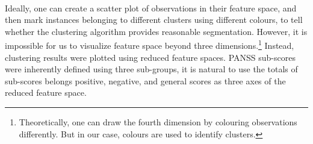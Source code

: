 \documentclass[11pt]{article}
\begin{document}
	\paragraph{} Ideally, one can create a scatter plot of observations in their feature space, and then mark instances belonging to different clusters using different colours, to tell whether the clustering algorithm provides reasonable segmentation. However, it is impossible for us to visualize feature space beyond three dimensions.\footnote{Theoretically, one can draw the fourth dimension by colouring observations differently. But in our case, colours are used to identify clusters.} Instead, clustering results were plotted using reduced feature spaces. PANSS sub-scores were inherently defined using three sub-groups, it is natural to use the totals of sub-scores belongs positive, negative, and general scores as three axes of the reduced feature space.
\end{document}
